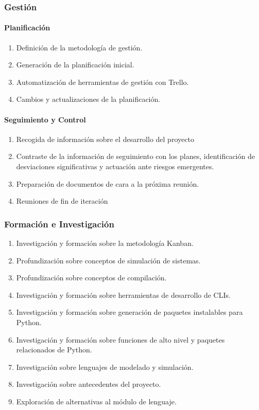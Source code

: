 \subsubsection{Gestión}
\paragraph{Planificación}
\begin{enumerate}
    \item Definición de la metodología de gestión.
    \item Generación de la planificación inicial.
    \item Automatización de herramientas de gestión con Trello.
    \item Cambios y actualizaciones de la planificación.
\end{enumerate}
\paragraph{Seguimiento y Control}
\begin{enumerate}
    \item Recogida de información sobre el desarrollo del proyecto
    \item Contraste de la información de seguimiento con los planes, identificación de desviaciones significativas y actuación ante riesgos emergentes.
    \item Preparación de documentos de cara a la próxima reunión.
    \item Reuniones de fin de iteración
\end{enumerate}

\subsubsection{Formación e Investigación}
\begin{enumerate}
    \item Investigación y formación sobre la metodología Kanban.
    \item Profundización sobre conceptos de simulación de sistemas.
    \item Profundización sobre conceptos de compilación.
    \item Investigación y formación sobre herramientas de desarrollo de CLIs.
    \item Investigación y formación sobre generación de paquetes instalables
    para Python.
    \item Investigación y formación sobre funciones de alto nivel y paquetes
    relacionados de Python.
    \item Investigación sobre lenguajes de modelado y simulación.
    \item Investigación sobre antecedentes del proyecto.
    \item Exploración de alternativas al módulo de lenguaje.
\end{enumerate}

